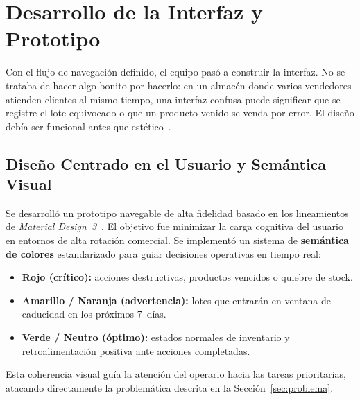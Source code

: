 \documentclass[journal]{IEEEtran}
\begin{document}
	
	
	\section{Desarrollo de la Interfaz y Prototipo}
	\label{sec:prototipo}
	
	Con el flujo de navegaci\'{o}n definido, el equipo pas\'{o} a
	construir la interfaz. No se trataba de hacer algo bonito por
	hacerlo: en un almac\'{e}n donde varios vendedores atienden
	clientes al mismo tiempo, una interfaz confusa puede significar
	que se registre el lote equivocado o que un producto venido se
	venda por error. El dise\~{n}o deb\'{i}a ser funcional antes que
	est\'{e}tico~\cite{MaterialDesign:2026}.
	
	\subsection{Dise\~{n}o Centrado en el Usuario y Sem\'{a}ntica Visual}
	\label{subsec:diseno}
	
	Se desarroll\'{o} un prototipo navegable de alta fidelidad basado en
	los lineamientos de \textit{Material Design~3}~\cite{MaterialDesign:2026}.
	El objetivo fue minimizar la carga cognitiva del usuario en entornos
	de alta rotaci\'{o}n comercial. Se implement\'{o} un sistema de
	\textbf{sem\'{a}ntica de colores} estandarizado para guiar decisiones
	operativas en tiempo real:
	
	\begin{itemize}[leftmargin=*, label=\textbullet, itemsep=2pt]
		\item \textbf{Rojo (cr\'{i}tico):} acciones destructivas, productos
		vencidos o quiebre de stock.
		
		\item \textbf{Amarillo / Naranja (advertencia):} lotes que
		entrar\'{a}n en ventana de caducidad en los pr\'{o}ximos 7~d\'{i}as.
		
		\item \textbf{Verde / Neutro (\'{o}ptimo):} estados normales de
		inventario y retroalimentaci\'{o}n positiva ante acciones
		completadas.
	\end{itemize}
	
	Esta coherencia visual gu\'{i}a la atenci\'{o}n del operario hacia
	las tareas prioritarias, atacando directamente la problem\'{a}tica
	descrita en la Secci\'{o}n~\ref{sec:problema}.
	
\end{document}
